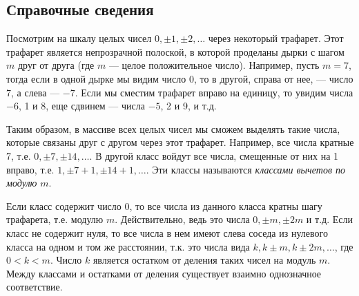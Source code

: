\subsection*{Справочные сведения}

Посмотрим на шкалу целых чисел $0,\pm1,\pm2,\dots$ через некоторый трафарет. Этот трафарет является непрозрачной полоской, в которой проделаны дырки с шагом $m$ друг от друга (где $m$ --- целое положительное число). Например, пусть $m=7$, тогда если в одной дырке мы видим число 0, то в другой, справа от нее, --- число 7, а слева --- $-7$. Если мы сместим трафарет вправо на единицу, то увидим числа $-6$, 1 и 8, еще сдвинем --- числа $-5$, 2 и 9, и т.д.  

Таким образом, в массиве всех целых чисел мы сможем выделять такие числа, которые связаны друг с другом через этот трафарет. Например, все числа кратные 7, т.е. $0,\pm7,\pm14,\dots$. В другой класс войдут все числа, смещенные от них на 1 вправо, т.е. $1,\pm7+1,\pm14+1,\dots$. Эти классы называются \textit{классами вычетов по модулю} $m$.

Если класс содержит число 0, то все числа из данного класса кратны шагу трафарета, т.е. модулю $m$. Действительно, ведь это числа $0,\pm m,\pm 2m$ и т.д. Если класс не содержит нуля, то все числа в нем имеют слева соседа из нулевого класса на одном и том же расстоянии, т.к. это числа вида $k,k\pm m,k\pm 2m,\dots$, где $0<k<m$. Число $k$ является остатком от деления таких чисел на модуль $m$. Между классами и остатками от деления существует взаимно однозначное соответствие.

